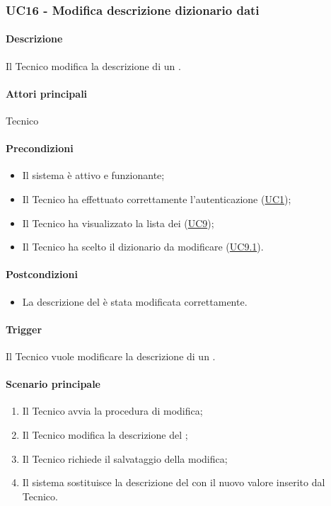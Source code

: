 \subsubsection{UC16 - Modifica descrizione dizionario dati}\label{UC16}
\paragraph*{Descrizione}
Il Tecnico modifica la descrizione di un .

\paragraph*{Attori principali}
Tecnico

\paragraph*{Precondizioni}
\begin{itemize}
  \item Il sistema è attivo e funzionante;
  \item Il Tecnico ha effettuato correttamente l'autenticazione (\hyperref[UC1]{UC1});
  \item Il Tecnico ha visualizzato la lista dei  (\hyperref[UC9]{UC9});
  \item Il Tecnico ha scelto il dizionario da modificare (\hyperref[UC9.1]{UC9.1}).
\end{itemize}

\paragraph*{Postcondizioni}
\begin{itemize}
  \item La descrizione del  è stata modificata correttamente.
\end{itemize}

\paragraph*{Trigger}
Il Tecnico vuole modificare la descrizione di un .

\paragraph*{Scenario principale}
\begin{enumerate}
  \item Il Tecnico avvia la procedura di modifica;
  \item Il Tecnico modifica la descrizione del ;
  \item Il Tecnico richiede il salvataggio della modifica;
  \item Il sistema sostituisce la descrizione del  con il nuovo valore inserito dal Tecnico.
\end{enumerate}


